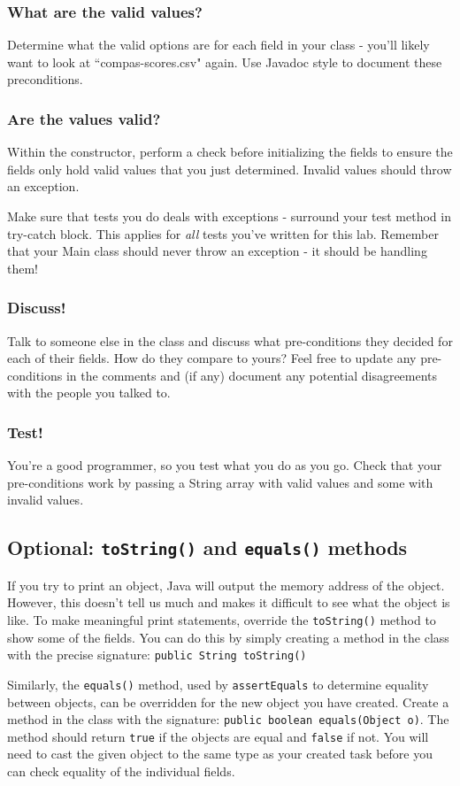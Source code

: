 \documentclass[12pt]{article}
\begin{document}
\subsubsection{What are the valid values?}
Determine what the valid options are for each field in your class - you'll likely want to look at ``compas-scores.csv" again.  Use Javadoc style to document these preconditions.

\subsubsection{Are the values valid?}
Within the constructor, perform a check before initializing the fields to ensure the fields only hold valid values that you just determined. Invalid values should throw an exception.

Make sure that tests you do deals with exceptions - surround your test method in try-catch block.  This applies for \emph{all} tests you've written for this lab.  Remember that your Main class should never throw an exception - it should be handling them!

\subsubsection{Discuss!}
Talk to someone else in the class and discuss what pre-conditions they decided for each of their fields. How do they compare to yours? Feel free to update any pre-conditions in the comments and (if any) document any potential disagreements with the people you talked to.

\subsubsection{Test!}
You're a good programmer, so you test what you do as you go. Check that your pre-conditions work by passing a String array with valid values and some with invalid values.

\subsection{Optional: \texttt{toString()} and \texttt{equals()} methods}
If you try to print an object, Java will output the memory address of the object.  
However, this doesn't tell us much and makes it difficult to see what the object is like.
To make meaningful print statements, override the \texttt{toString()} method to show some of the fields. You can do this by simply creating a method in the class with the precise signature: \texttt{public String toString()}

Similarly, the \texttt{equals()} method, used by \texttt{assertEquals} to determine equality between objects, can be overridden for the new object you have created.  Create a method in the class with the signature: \texttt{public boolean equals(Object o)}.  The method should return \texttt{true} if the objects are equal and \texttt{false} if not.  You will need to cast the given object to the same type as your created task before you can check equality of the individual fields.
\end{document}
